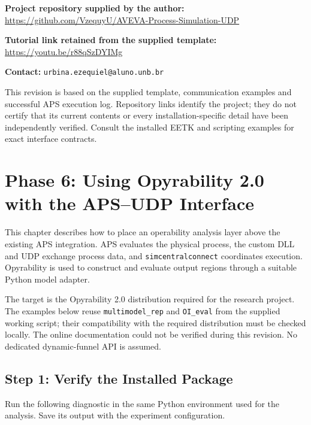 \documentclass[11pt, letterpaper]{article}
\begin{document}
\vspace{0.6cm}
\noindent\textbf{Project repository supplied by the author:}\\
\url{https://github.com/VzequyU/AVEVA-Process-Simulation-UDP}

\vspace{0.3cm}
\noindent\textbf{Tutorial link retained from the supplied template:}\\
\url{https://youtu.be/r88qSzDYIMg}

\vspace{0.3cm}
\noindent\textbf{Contact:} \texttt{urbina.ezequiel@aluno.unb.br}

\begin{notebox}
This revision is based on the supplied template, communication examples and successful APS execution log. Repository links identify the project; they do not certify that its current contents or every installation-specific detail have been independently verified. Consult the installed EETK and scripting examples for exact interface contracts.
\end{notebox}

\newpage
\section{Phase 6: Using Opyrability 2.0 with the APS--UDP Interface}
\label{sec:opyrability2}

This chapter describes how to place an operability analysis layer above the existing APS integration. APS evaluates the physical process, the custom DLL and UDP exchange process data, and \texttt{simcentralconnect} coordinates execution. Opyrability is used to construct and evaluate output regions through a suitable Python model adapter.

The target is the Opyrability 2.0 distribution required for the research project. The examples below reuse \texttt{multimodel\_rep} and \texttt{OI\_eval} from the supplied working script; their compatibility with the required distribution must be checked locally. The online documentation could not be verified during this revision. No dedicated dynamic-funnel API is assumed.

\subsection{Step 1: Verify the Installed Package}
Run the following diagnostic in the same Python environment used for the analysis. Save its output with the experiment configuration.
\end{document}
